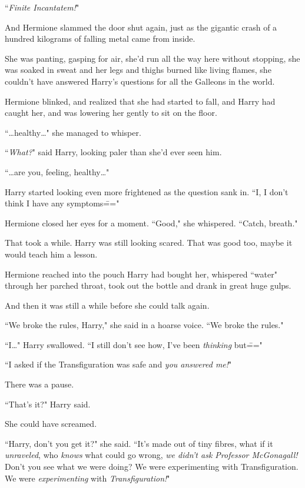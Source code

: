 ``\emph{Finite Incantatem!}"

And Hermione slammed the door shut again, just as the gigantic crash of a hundred kilograms of falling metal came from inside.

She was panting, gasping for air, she'd run all the way here without stopping, she was soaked in sweat and her legs and thighs burned like living flames, she couldn't have answered Harry's questions for all the Galleons in the world.

Hermione blinked, and realized that she had started to fall, and Harry had caught her, and was lowering her gently to sit on the floor.

``{\ldots}healthy{\ldots}" she managed to whisper.

``\emph{What?}" said Harry, looking paler than she'd ever seen him.

``{\ldots}are you, feeling, healthy{\ldots}"

Harry started looking even more frightened as the question sank in. ``I, I don't think I have any symptoms\==="

Hermione closed her eyes for a moment. ``Good," she whispered. ``Catch, breath."

That took a while. Harry was still looking scared. That was good too, maybe it would teach him a lesson.

Hermione reached into the pouch Harry had bought her, whispered ``water" through her parched throat, took out the bottle and drank in great huge gulps.

And then it was still a while before she could talk again.

``We broke the rules, Harry," she said in a hoarse voice. ``We broke the rules."

``I{\ldots}" Harry swallowed. ``I still don't see how, I've been \emph{thinking} but\==="

``I asked if the Transfiguration was safe and \emph{you answered me!}"

There was a pause.

``That's it?" Harry said.

She could have screamed.

``Harry, don't you get it?" she said. ``It's made out of tiny fibres, what if it \emph{unraveled}, who \emph{knows} what could go wrong, \emph{we didn't ask Professor McGonagall!} Don't you see what we were doing? We were experimenting with Transfiguration. We were \emph{experimenting} with \emph{Transfiguration!}"

